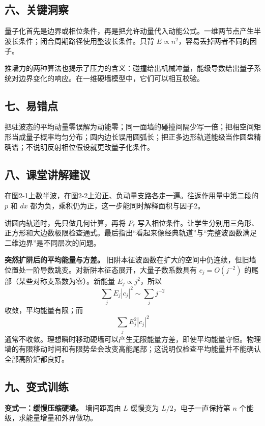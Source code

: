 \documentclass[12pt,a4paper,UTF8]{ctexart}
\begin{document}
\subsection{六、关键洞察}\label{ux516dux5173ux952eux6d1eux5bdf-1}

量子化首先是边界或相位条件，再是把允许动量代入动能公式。一维两节点产生半波长条件；闭合周期路径使用整波长条件。只背
\(E\propto n^2\)，容易丢掉两者不同的因子。

推墙力的两种算法也揭示了压力的含义：碰撞给出机械冲量，能级导数给出量子系统对边界变化的响应。在一维硬墙模型中，它们可以相互校验。

\subsection{七、易错点}\label{ux4e03ux6613ux9519ux70b9-1}

把驻波态的平均动量零误解为动能零；同一面墙的碰撞间隔少写一倍；把相空间矩形当成量子概率均匀分布；圆内边长误用圆弧长；把正多边形轨道能级当作圆盘精确谱；不说明反射相位假设就更改量子化条件。

\subsection{八、课堂讲解建议}\label{ux516bux8bfeux5802ux8bb2ux89e3ux5efaux8bae-1}

在图2-1上数半波，在图2-2上沿正、负动量支路各走一遍。往返作用量中第二段的
\(p\) 和 \(dx\) 都为负，乘积仍为正，这一步能同时解释面积与因子2。

讲圆内轨道时，先只做几何计算，再将 \(P_\ell\)
写入相位条件。让学生分别用三角形、正方形和大边数极限检查通式。最后指出``看起来像经典轨道''与``完整波函数满足二维边界''是不同层次的问题。

\textbf{突然扩阱后的平均能量与方差。}
旧阱本征波函数在扩大的空间中仍连续，但旧墙位置处一阶导数跳变。对新阱本征态展开，大量子数系数具有
\(c_j=O(j^{-2})\) 的尾部（某些对称支系数为零）。新能量
\(E_j\propto j^2\)，所以 \[
\sum_j E_j|c_j|^2\sim\sum_jj^{-2}
\] 收敛，平均能量有限；而 \[
\sum_j E_j^2|c_j|^2
\]
通常不收敛。理想瞬时移动硬墙可以产生无限能量方差，即使平均能量守恒。物理墙的有限移动时间和有限势垒会改变高能尾部；这说明仅检查平均能量并不能确认全部高阶矩都良好。

\subsection{九、变式训练}\label{ux4e5dux53d8ux5f0fux8badux7ec3-1}

\textbf{变式一：缓慢压缩硬墙。} 墙间距离由 \(L\) 缓慢变为
\(L/2\)，电子一直保持第 \(n\) 个能级，求能量增量和外界做功。
\end{document}
